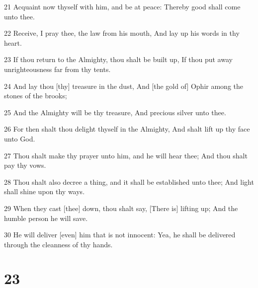 \par 21 Acquaint now thyself with him, and be at peace: Thereby good shall come unto thee.
\par 22 Receive, I pray thee, the law from his mouth, And lay up his words in thy heart.
\par 23 If thou return to the Almighty, thou shalt be built up, If thou put away unrighteousness far from thy tents.
\par 24 And lay thou [thy] treasure in the dust, And [the gold of] Ophir among the stones of the brooks;
\par 25 And the Almighty will be thy treasure, And precious silver unto thee.
\par 26 For then shalt thou delight thyself in the Almighty, And shalt lift up thy face unto God.
\par 27 Thou shalt make thy prayer unto him, and he will hear thee; And thou shalt pay thy vows.
\par 28 Thou shalt also decree a thing, and it shall be established unto thee; And light shall shine upon thy ways.
\par 29 When they cast [thee] down, thou shalt say, [There is] lifting up; And the humble person he will save.
\par 30 He will deliver [even] him that is not innocent: Yea, he shall be delivered through the cleanness of thy hands.

\chapter{23}

